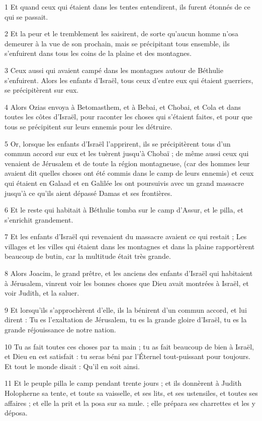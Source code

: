 \par 1 Et quand ceux qui étaient dans les tentes entendirent, ils furent étonnés de ce qui se passait.
\par 2 Et la peur et le tremblement les saisirent, de sorte qu'aucun homme n'osa demeurer à la vue de son prochain, mais se précipitant tous ensemble, ils s'enfuirent dans tous les coins de la plaine et des montagnes.
\par 3 Ceux aussi qui avaient campé dans les montagnes autour de Béthulie s'enfuirent. Alors les enfants d'Israël, tous ceux d'entre eux qui étaient guerriers, se précipitèrent sur eux.
\par 4 Alors Ozias envoya à Betomasthem, et à Bebai, et Chobai, et Cola et dans toutes les côtes d'Israël, pour raconter les choses qui s'étaient faites, et pour que tous se précipitent sur leurs ennemis pour les détruire.
\par 5 Or, lorsque les enfants d'Israël l'apprirent, ils se précipitèrent tous d'un commun accord sur eux et les tuèrent jusqu'à Chobaï ; de même aussi ceux qui venaient de Jérusalem et de toute la région montagneuse, (car des hommes leur avaient dit quelles choses ont été commis dans le camp de leurs ennemis) et ceux qui étaient en Galaad et en Galilée les ont poursuivis avec un grand massacre jusqu'à ce qu'ils aient dépassé Damas et ses frontières.
\par 6 Et le reste qui habitait à Béthulie tomba sur le camp d'Assur, et le pilla, et s'enrichit grandement.
\par 7 Et les enfants d'Israël qui revenaient du massacre avaient ce qui restait ; Les villages et les villes qui étaient dans les montagnes et dans la plaine rapportèrent beaucoup de butin, car la multitude était très grande.
\par 8 Alors Joacim, le grand prêtre, et les anciens des enfants d'Israël qui habitaient à Jérusalem, vinrent voir les bonnes choses que Dieu avait montrées à Israël, et voir Judith, et la saluer.
\par 9 Et lorsqu'ils s'approchèrent d'elle, ils la bénirent d'un commun accord, et lui dirent : Tu es l'exaltation de Jérusalem, tu es la grande gloire d'Israël, tu es la grande réjouissance de notre nation.
\par 10 Tu as fait toutes ces choses par ta main ; tu as fait beaucoup de bien à Israël, et Dieu en est satisfait : tu seras béni par l'Éternel tout-puissant pour toujours. Et tout le monde disait : Qu’il en soit ainsi.
\par 11 Et le peuple pilla le camp pendant trente jours ; et ils donnèrent à Judith Holopherne sa tente, et toute sa vaisselle, et ses lits, et ses ustensiles, et toutes ses affaires ; et elle la prit et la posa sur sa mule. ; elle prépara ses charrettes et les y déposa.
